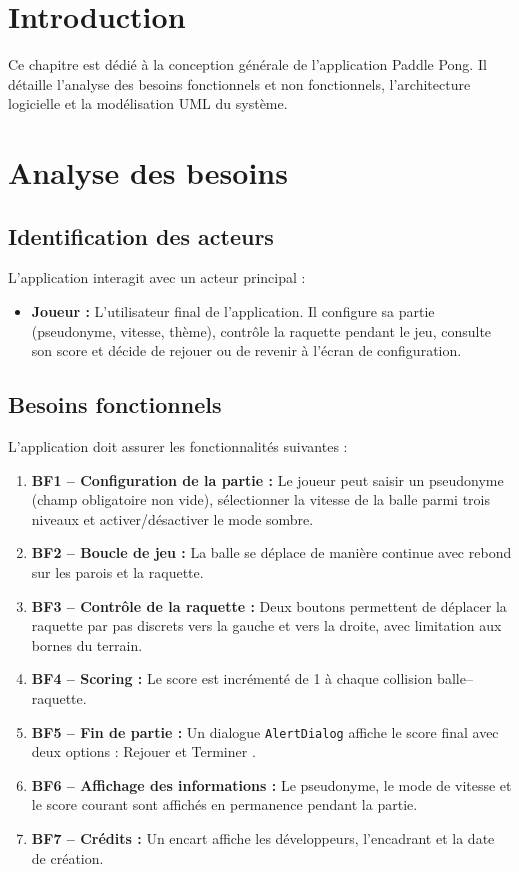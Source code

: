 \documentclass[12pt,a4paper]{report}
\begin{document}
\section*{Introduction}
Ce chapitre est d\'edi\'e \`a la conception g\'en\'erale de l'application Paddle Pong. Il d\'etaille l'analyse des besoins fonctionnels et non fonctionnels, l'architecture logicielle et la mod\'elisation UML du syst\`eme.

\section{Analyse des besoins}

\subsection{Identification des acteurs}
L'application interagit avec un acteur principal :
\begin{itemize}
    \item \textbf{Joueur :} L'utilisateur final de l'application. Il configure sa partie (pseudonyme, vitesse, th\`eme), contr\^ole la raquette pendant le jeu, consulte son score et d\'ecide de rejouer ou de revenir \`a l'\'ecran de configuration.
\end{itemize}

\subsection{Besoins fonctionnels}
L'application doit assurer les fonctionnalit\'es suivantes :
\begin{enumerate}
    \item \textbf{BF1 -- Configuration de la partie :} Le joueur peut saisir un pseudonyme (champ obligatoire non vide), s\'electionner la vitesse de la balle parmi trois niveaux et activer/d\'esactiver le mode sombre.
    \item \textbf{BF2 -- Boucle de jeu :} La balle se d\'eplace de mani\`ere continue avec rebond sur les parois et la raquette.
    \item \textbf{BF3 -- Contr\^ole de la raquette :} Deux boutons permettent de d\'eplacer la raquette par pas discrets vers la gauche et vers la droite, avec limitation aux bornes du terrain.
    \item \textbf{BF4 -- Scoring :} Le score est incr\'ement\'e de 1 \`a chaque collision balle--raquette.
    \item \textbf{BF5 -- Fin de partie :} Un dialogue \texttt{AlertDialog} affiche le score final avec deux options : \og Rejouer \fg{} et \og Terminer \fg{}.
    \item \textbf{BF6 -- Affichage des informations :} Le pseudonyme, le mode de vitesse et le score courant sont affich\'es en permanence pendant la partie.
    \item \textbf{BF7 -- Cr\'edits :} Un encart affiche les d\'eveloppeurs, l'encadrant et la date de cr\'eation.
\end{enumerate}
\end{document}
